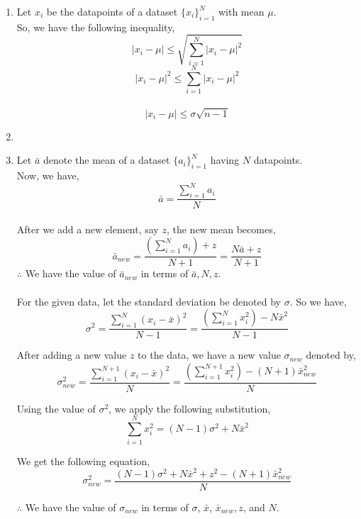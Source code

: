 \documentclass[11pt]{article}
\begin{document}
\begin{enumerate}
	\item {
	Let $x_i$ be the datapoints of a dataset $\{x_i\}_{i=1}^{N}$ with mean $\mu$. \\
	So, we have the following inequality,
	$$	\left|x_i - \mu\right| \leq \sqrt{\sum_{i=1}^{N}{\left|x_i -\mu\right|}^2} $$
	$$	\left|x_i -\mu\right|^2 \leq \sum_{i=1}^{N}{\left|x_i -\mu\right|}^2 $$ \\
	$$	\left|x_i - \mu\right| \leq \sigma\sqrt{n-1} $$ 
		\hfill {}
	}

	\item {

	}

	\item {
	Let $ \bar{a} $ denote the mean of a dataset $\{a_i\}_{i=1}^{N}$ having $N$ datapoints. \\ 
	Now, we have, \\
	$$ \bar{a} = \frac{\sum_{i=1}^N{a_i}}{N} $$ \\
	After we add a new element, say $z$, the new mean becomes, \\
	$$\bar{a}_{new} = \frac{(\sum_{i=1}^{N}{a_i} )+ z}{N+1} = \frac{N\bar{a}+z}{N+1} $$
	$\therefore$ We have the value of $\bar{a}_{new}$ in terms of $\bar{a},N,z$. \\ \\

	For the given data, let the standard deviation be denoted by $\sigma$. So we have, \\
	$$\sigma^2 = \frac{\sum_{i=1}^{N}{(x_i-\bar{x})^2}}{N-1} = \frac{(\sum_{i=1}^{N}{x_i^2}) - N\bar{x}^2}{N-1}$$
	
	After adding a new value $z$ to the data, we have a new value $\sigma_{new}$ denoted by, \\
	$$ \sigma_{new}^2 = \frac{\sum_{i=1}^{N+1}{(x_i-\bar{x})^2}}{N} = \frac{(\sum_{i=1}^{N+1}{x_i^2}) - (N+1)\bar{x}_{new}^2}{N} $$
	
	Using the value of $\sigma^2$, we apply the following substitution, \\
	$$ \sum_{i=1}^{N}{x_i^2} = (N-1)\sigma^2 + N\bar{x}^2 $$

	We get the following equation, \\
	$$ \sigma_{new}^2  = \frac{(N-1)\sigma^2 + N\bar{x}^2 + z^2 - (N+1)\bar{x}_{new}^2}{N} $$

	$\therefore$ We have the value of $\sigma_{new}$ in terms of $\sigma$, $\bar{x}$, $\bar{x}_{new}, z$, and $N$. \\
	}
\end{enumerate}
\end{document}
